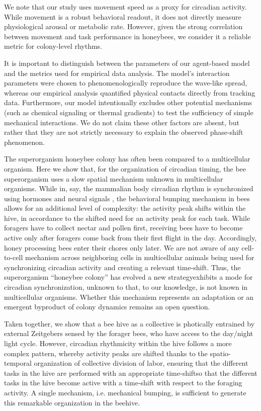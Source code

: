 \documentclass{article}
\newcommand{\added}[1]{{\color{blue}#1}}
\newcommand{\deleted}[1]{{\color{red}#1}} %
\newcommand{\replaced}[2]{\deleted{#1}\added{#2}}
\newcommand{\added}[1]{#1}
\newcommand{\deleted}[1]{}
\newcommand{\replaced}[2]{#2}
\begin{document}
\added{We note that our study uses movement speed as a proxy for circadian activity. While movement is a robust behavioral readout, it does not directly measure physiological arousal or metabolic rate. However, given the strong correlation between movement and task performance in honeybees, we consider it a reliable metric for colony-level rhythms.}

\added{It is important to distinguish between the parameters of our agent-based model and the metrics used for empirical data analysis. The model's interaction parameters were chosen to phenomenologically reproduce the wave-like spread, whereas our empirical analysis quantified physical contacts directly from tracking data. Furthermore, our model intentionally excludes other potential mechanisms (such as chemical signaling or thermal gradients) to test the sufficiency of simple mechanical interactions. We do not claim these other factors are absent, but rather that they are not strictly necessary to explain the observed phase-shift phenomenon.} 
 
\deleted{The superorganism honeybee colony has often been compared to a multicellular organism. Here we show that, for the organization of circadian timing, the bee superorganism uses a slow spatial mechanism unknown in multicellular organisms. While in, say, the mammalian body circadian rhythm is synchronized using hormones and neural signals \cite{finger_coupled_2020, pilorz_concept_2020}, the behavioral bumping mechanism in bees allows for an additional level of complexity: the activity peak shifts within the hive, in accordance to the shifted need for an activity peak for each task. While foragers have to collect nectar and pollen first, receiving bees have to become active only after foragers come back from their first flight in the day. Accordingly, honey processing bees enter their chores only later.} We are not aware of any cell-to-cell mechanism across neighboring cells in multicellular animals being used for synchronizing circadian activity and creating a relevant time-shift. Thus, the superorganism “honeybee colony” \replaced{has evolved a new strategy}{exhibits a mode} for circadian synchronization\replaced{, unknown to}{ that, to our knowledge, is not known in} multicellular organisms. \added{Whether this mechanism represents an adaptation or an emergent byproduct of colony dynamics remains an open question.}

Taken together, we show that a bee hive as a collective is photically entrained by external Zeitgebers sensed by the forager bees, who have access to the day/night light cycle. However, circadian rhythmicity within the hive follows a more complex pattern, whereby activity peaks are shifted thanks to the spatio-temporal organization of collective division of labor, \replaced{ensuring that the different tasks in the hive are performed with an appropriate time-shift}{so that the different tasks in the hive become active with a time-shift} with respect to the foraging activity. A single mechanism, i.e. mechanical bumping, is sufficient to generate this remarkable organization in the beehive. 
 
\end{document}
